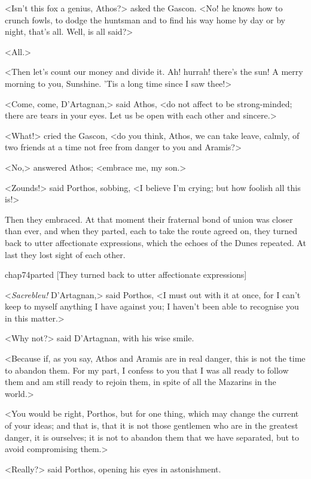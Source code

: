 <Isn't this fox a genius, Athos?> asked the Gascon. <No! he knows how to crunch fowls, to dodge the huntsman and to find his way home by day or by night, that's all. Well, is all said?>

<All.>

<Then let's count our money and divide it. Ah! hurrah! there's the sun! A merry morning to you, Sunshine. 'Tis a long time since I saw thee!>

<Come, come, D'Artagnan,> said Athos, <do not affect to be strong-minded; there are tears in your eyes. Let us be open with each other and sincere.>

<What!> cried the Gascon, <do you think, Athos, we can take leave, calmly, of two friends at a time not free from danger to you and Aramis?>

<No,> answered Athos; <embrace me, my son.>

<Zounds!> said Porthos, sobbing, <I believe I'm crying; but how foolish all this is!>

Then they embraced. At that moment their fraternal bond of union was closer than ever, and when they parted, each to take the route agreed on, they turned back to utter affectionate expressions, which the echoes of the Dunes repeated. At last they lost sight of each other.

\begin{bwbigpic}
	[\basicscale] 
	{chap74parted}
	[They turned back to utter affectionate expressions]
\end{bwbigpic}

<\textit{Sacrebleu!} D'Artagnan,> said Porthos, <I must out with it at once, for I can't keep to myself anything I have against you; I haven't been able to recognise you in this matter.>

<Why not?> said D'Artagnan, with his wise smile.

<Because if, as you say, Athos and Aramis are in real danger, this is not the time to abandon them. For my part, I confess to you that I was all ready to follow them and am still ready to rejoin them, in spite of all the Mazarins in the world.>

<You would be right, Porthos, but for one thing, which may change the current of your ideas; and that is, that it is not those gentlemen who are in the greatest danger, it is ourselves; it is not to abandon them that we have separated, but to avoid compromising them.>

<Really?> said Porthos, opening his eyes in astonishment.

